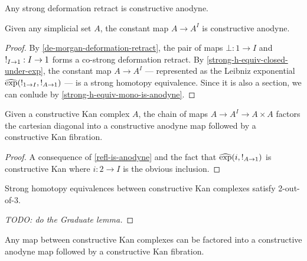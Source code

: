 \documentclass[reqno,10pt,a4paper,oneside]{amsart}
\begin{document}
\begin{corollary}
\label{strong-deformation-retract-is-anodyne}
Any strong deformation retract is constructive anodyne.
\end{corollary}

\begin{corollary}
\label{refl-is-anodyne}
Given any simplicial set $A$, the constant map $A \to A^I$ is constructive anodyne.
\end{corollary}

\begin{proof}
By \cref{de-morgan-deformation-retract}, the pair of maps $\bot : 1 \to I$ and $\mathord{!}_{I \to 1} : I \to 1$ forms a co-strong deformation retract.
By \cref{strong-h-equiv-closed-under-exp}, the constant map $A \to A^I$ --- represented as the Leibniz exponential $\operatorname{\widehat{exp}}(\mathord{!}_{1 \to I}, \mathord{!}_{A \to 1})$ --- is a strong homotopy equivalence.
Since it is also a section, we can conlude by \cref{strong-h-equiv-mono-is-anodyne}.
\end{proof}

\begin{corollary}
\label{path-object}
Given a constructive Kan complex $A$, the chain of maps $A \to A^I \to A \times A$ factors the cartesian diagonal into a constructive anodyne map followed by a constructive Kan fibration.
\end{corollary}

\begin{proof}
A consequence of \cref{refl-is-anodyne} and the fact that $\operatorname{\widehat{exp}}(i, \mathord{!}_{A \to 1})$ is constructive Kan where $i : 2 \to I$ is the obvious inclusion.
\end{proof}

\begin{lemma}
\label{2-out-of-3}
Strong homotopy equivalences between constructive Kan complexes satisfy 2-out-of-3. 
\end{lemma}

\begin{proof}
[TODO: do the Graduate lemma] 
\end{proof}

\begin{proposition}
\label{fibrant-cod-factorization}
Any map between constructive Kan complexes can be factored into a constructive anodyne map followed by a constructive Kan fibration.
\end{proposition}
\end{document}
